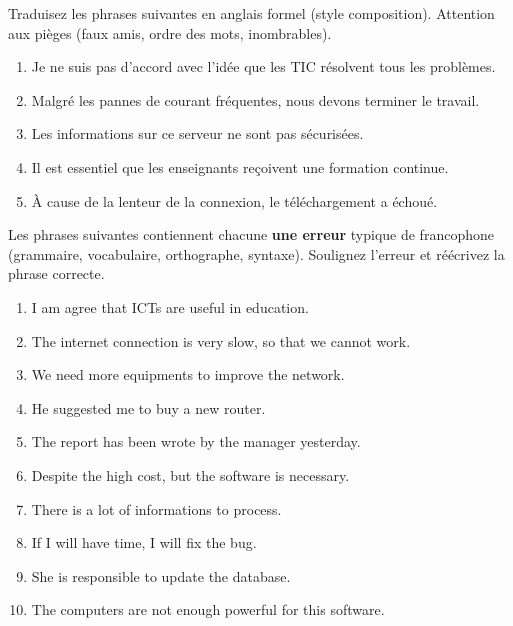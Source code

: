 \documentclass[11pt]{article}
\newcounter{popsec}
\newcounter{popsub}
\newcommand{\courssub}[1]{%
  \stepcounter{popsub}%
  \par\vspace{9pt}\noindent{\popxbold\fontsize{11.5}{13}\selectfont\color{popink}{\color{poporange}\thepopsec.\thepopsub}\hspace{6pt}#1}\par\nopagebreak\vspace{4pt}
}
\begin{document}
\courssub{Je m'entraîne}

\begin{exercice}
Traduisez les phrases suivantes en anglais formel (style composition). Attention aux pièges (faux amis, ordre des mots, inombrables).
\begin{enumerate}
    \item Je ne suis pas d'accord avec l'idée que les TIC résolvent tous les problèmes.
    \item Malgré les pannes de courant fréquentes, nous devons terminer le travail.
    \item Les informations sur ce serveur ne sont pas sécurisées.
    \item Il est essentiel que les enseignants reçoivent une formation continue.
    \item À cause de la lenteur de la connexion, le téléchargement a échoué.
\end{enumerate}
\end{exercice}

\begin{exercice}
Les phrases suivantes contiennent chacune \textbf{une erreur} typique de francophone (grammaire, vocabulaire, orthographe, syntaxe). Soulignez l'erreur et réécrivez la phrase correcte.
\begin{enumerate}
    \item I am agree that ICTs are useful in education.
    \item The internet connection is very slow, so that we cannot work.
    \item We need more equipments to improve the network.
    \item He suggested me to buy a new router.
    \item The report has been wrote by the manager yesterday.
    \item Despite the high cost, but the software is necessary.
    \item There is a lot of informations to process.
    \item If I will have time, I will fix the bug.
    \item She is responsible to update the database.
    \item The computers are not enough powerful for this software.
\end{enumerate}
\end{exercice}
\end{document}
